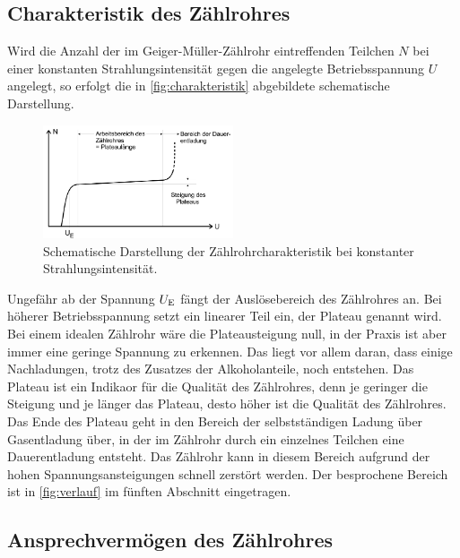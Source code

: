 \subsection{Charakteristik des Zählrohres}
\label{subsec:ZaehlrohrCharakteristik}

Wird die Anzahl der im Geiger-Müller-Zählrohr eintreffenden Teilchen $N$ bei einer konstanten Strahlungsintensität gegen die angelegte Betriebsspannung $U$ angelegt, so erfolgt die in \autoref{fig:charakteristik} abgebildete schematische Darstellung.
\begin{figure}[H]
    \centering
    \includegraphics[width=0.5\textwidth]{data/charakteristik.png}
    \caption{Schematische Darstellung der Zählrohrcharakteristik bei konstanter Strahlungsintensität.}
    \label{fig:charakteristik}
\end{figure}

Ungefähr ab der Spannung $U_\text E$ fängt der Auslösebereich des Zählrohres an. Bei höherer Betriebsspannung setzt ein linearer Teil ein, der Plateau genannt wird. Bei einem idealen Zählrohr wäre die Plateausteigung null, in der Praxis ist aber immer eine geringe Spannung zu erkennen.
Das liegt vor allem daran, dass einige Nachladungen, trotz des Zusatzes der Alkoholanteile, noch entstehen. Das Plateau ist ein Indikaor für die Qualität des Zählrohres, denn je geringer die Steigung und je länger das Plateau, desto höher ist die Qualität des Zählrohres.
Das Ende des Plateau geht in den Bereich der selbstständigen Ladung über Gasentladung über, in der im Zählrohr durch ein einzelnes Teilchen eine Dauerentladung entsteht. Das Zählrohr kann in diesem Bereich aufgrund der hohen Spannungsansteigungen schnell zerstört werden.
Der besprochene Bereich ist in \autoref{fig:verlauf} im fünften Abschnitt eingetragen.

\subsection{Ansprechvermögen des Zählrohres}
\label{subsec:Ansprechvermoegen}

